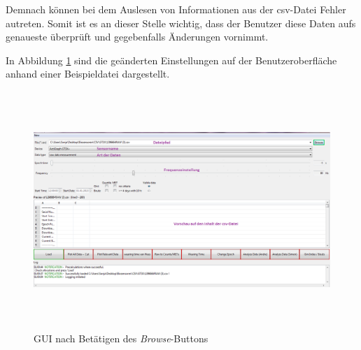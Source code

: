\documentclass[onecolumn,german]{article}
\begin{document}
Demnach können bei dem Auslesen von Informationen aus der csv-Datei Fehler autreten. Somit ist es an dieser Stelle wichtig, dass der Benutzer diese Daten aufs genaueste überprüft und gegebenfalls Änderungen vornimmt.\newline

In Abbildung \ref{bb} sind die geänderten Einstellungen auf der Benutzeroberfläche anhand einer Beispieldatei dargestellt.


%

\begin{figure}[H]
\centerline{
\includegraphics[width=160mm, height=90mm]{Abbildungen/Browse-Button.png}
}
\caption {GUI nach Betätigen des \textit{Browse}-Buttons}
\label{bb}
\end{figure}
\end{document}
